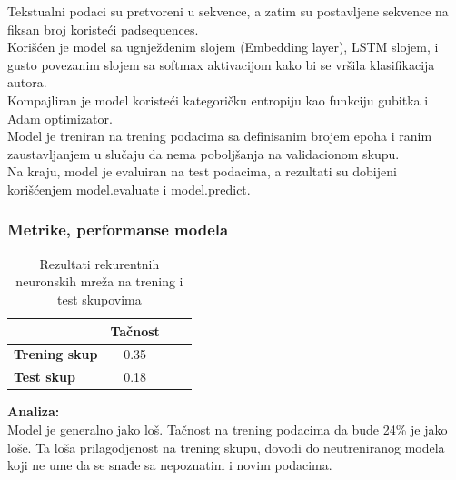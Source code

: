\documentclass{article}
\begin{document}
\begin{flushleft}
\vspace{4pt}
Tekstualni podaci su pretvoreni u sekvence, a zatim su postavljene sekvence na
fiksan broj koristeći pad\textunderscore sequences.\\



Korišćen je model sa ugnježdenim slojem (Embedding layer), LSTM slojem, i gusto 
povezanim slojem sa softmax aktivacijom kako bi se vršila klasifikacija autora.\\
Kompajliran je model koristeći kategoričku entropiju kao funkciju gubitka i Adam 
optimizator.\\

Model je treniran na trening podacima sa definisanim brojem epoha i ranim 
zaustavljanjem u slučaju da nema poboljšanja na validacionom skupu.\\

Na kraju, model je evaluiran na test podacima, a rezultati su dobijeni korišćenjem
model.evaluate i model.predict.\\


\vspace{2mm}
\subsubsection{Metrike, performanse modela} 

\begin{center}
  \begin{table}[h]
    \centering
    \begin{tabular}{lccc}
      \hline
      & \textbf{Tačnost} \\
      \hline
      \textbf{Trening skup} & 0.35 \\
      \textbf{Test skup} & 0.18 \\
      \hline
    \end{tabular}
    \caption*{Rezultati rekurentnih neuronskih mreža na trening i test skupovima}
    \label{tab:setfit_results}
  \end{table}
\end{center}

\textbf{Analiza:}\\
Model je generalno jako loš. Tačnost na trening podacima da bude 24\% je jako loše. Ta loša prilagodjenost na trening skupu, dovodi do neutreniranog modela koji ne ume da se snađe sa nepoznatim i novim podacima.


\end{flushleft}

\newpage
\end{document}

